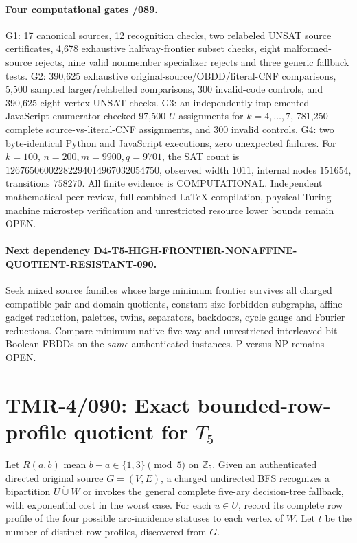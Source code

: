 \documentclass[11pt]{article}
\begin{document}
\paragraph{Four computational gates /089.}
G1: 17 canonical sources, 12 recognition checks, two relabeled UNSAT source certificates, 4,678 exhaustive halfway-frontier subset checks, eight malformed-source rejects, nine valid nonmember specializer rejects and three generic fallback tests.
G2: 390,625 exhaustive original-source/OBDD/literal-CNF comparisons, 5,500 sampled larger/relabelled comparisons, 300 invalid-code controls, and 390,625 eight-vertex UNSAT checks.
G3: an independently implemented JavaScript enumerator checked 97,500 $U$ assignments for $k=4,\ldots,7$, 781,250 complete source-vs-literal-CNF assignments, and 300 invalid controls.
G4: two byte-identical Python and JavaScript executions, zero unexpected failures. For $k=100$, $n=200,m=9900,q=9701$, the SAT count is $12676506002282294014967032054750$, observed width $1011$, internal nodes $151654$, transitions $758270$. All finite evidence is COMPUTATIONAL.
Independent mathematical peer review, full combined \LaTeX{} compilation, physical Turing-machine microstep verification and unrestricted resource lower bounds remain OPEN.

\paragraph{Next dependency D4-T5-HIGH-FRONTIER-NONAFFINE-QUOTIENT-RESISTANT-090.}
Seek mixed source families whose large minimum frontier survives all charged compatible-pair and domain quotients, constant-size forbidden subgraphs, affine gadget reduction, palettes, twins, separators, backdoors, cycle gauge and Fourier reductions. Compare minimum native five-way and unrestricted interleaved-bit Boolean FBDDs on the \emph{same} authenticated instances. P versus NP remains OPEN.


\section{TMR-4/090: Exact bounded-row-profile quotient for $T_5$}
\label{sec:tmr4-rowprofile090}
Let $R(a,b)$ mean $b-a\in\{1,3\}\pmod 5$ on $\mathbb Z_5$.
Given an authenticated directed original source $G=(V,E)$, a charged
undirected BFS recognizes a bipartition $U\dot\cup W$ or invokes the
general complete five-ary decision-tree fallback, with exponential cost
in the worst case.  For each $u\in U$, record its complete row profile
of the four possible arc-incidence statuses to each vertex of $W$.
Let $t$ be the number of distinct row profiles, discovered from $G$.
\end{document}
